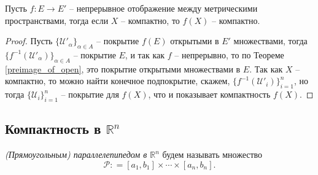 \begin{theorem}\label{image_of_compact}
    Пусть $f:E\to E'$ -- непрерывное отображение между метрическими пространствами, тогда если $X$ -- компактно, то $f(X)$ -- компактно.
\end{theorem}

\begin{proof}
    Пусть $\{\mathscr{U}'_\alpha\}_{\alpha \in A}$ -- покрытие $f(E)$ открытыми в $E'$ множествами, тогда $\{f^{-1}(\mathscr{U}'_\alpha)\}_{\alpha \in A}$ -- покрытие $E$, и так как $f$ -- непрерывно, то по Теореме \ref{preimage_of_open}, это покрытие открытыми множествами в $E.$ Так как $X$ -- компактно, то можно найти конечное подпокрытие, скажем, $\{f^{-1}(\mathscr{U}'_i)\}_{i=1}^n$, но тогда $\{\mathscr{U}_i\}_{i=1}^n$ -- покрытие для $f(X)$, что и показывает компактность $f(X).$
\end{proof}


\subsection{Компактность в $\mathbb{R}^n$}

\textit{(Прямоугольным) параллелепипедом в $\mathbb{R}^n$} будем называть множество 
\[
  \mathcal{P}: = [a_1, b_1] \times \cdots \times [a_n, b_n].
\]


